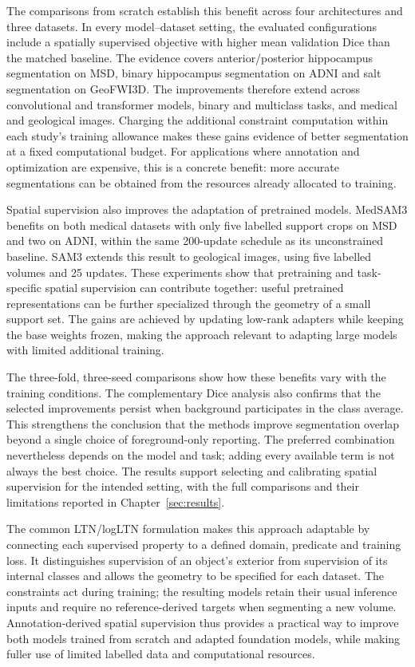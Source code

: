 \documentclass[12pt,a4paper]{article}
\begin{document}
The comparisons from scratch establish this benefit across four
architectures and three datasets. In every model--dataset setting, the
evaluated configurations include a spatially supervised objective with
higher mean validation Dice than the matched baseline. The evidence
covers anterior/posterior hippocampus segmentation on MSD, binary
hippocampus segmentation on ADNI and salt segmentation on GeoFWI3D.
The improvements therefore extend across convolutional and transformer
models, binary and multiclass tasks, and medical and geological images.
Charging the additional constraint computation within each study's
training allowance makes these gains evidence of better segmentation
at a fixed computational budget. For applications where annotation and
optimization are expensive, this is a concrete benefit: more accurate
segmentations can be obtained from the resources already allocated to
training.

Spatial supervision also improves the adaptation of pretrained models.
MedSAM3 benefits on both medical datasets with only five labelled support
crops on MSD and two on ADNI, within the same 200-update schedule as its
unconstrained baseline. SAM3 extends this result to geological images,
using five labelled volumes and 25 updates. These experiments show that
pretraining and task-specific spatial supervision can contribute
together: useful pretrained representations can be further specialized
through the geometry of a small support set. The gains are achieved by
updating low-rank adapters while keeping the base weights frozen, making
the approach relevant to adapting large models with limited additional
training.

The three-fold, three-seed comparisons show how these benefits vary with
the training conditions. The complementary Dice analysis also confirms
that the selected improvements persist when background participates in
the class average. This strengthens the conclusion that the methods
improve segmentation overlap beyond a single choice of foreground-only
reporting. The preferred combination nevertheless depends on the model
and task; adding every available term is not always the best choice.
The results support selecting and calibrating spatial supervision for
the intended setting, with the full comparisons and their limitations
reported in Chapter~\ref{sec:results}.

The common LTN/logLTN formulation makes this approach adaptable by
connecting each supervised property to a defined domain, predicate and
training loss. It distinguishes supervision of an object's exterior
from supervision of its internal classes and allows the geometry to be
specified for each dataset. The constraints act during training; the
resulting models retain their usual inference inputs and require no
reference-derived targets when segmenting a new volume. Annotation-derived
spatial supervision thus provides a practical way to improve both
models trained from scratch and adapted foundation models, while making
fuller use of limited labelled data and computational resources.
\end{document}
